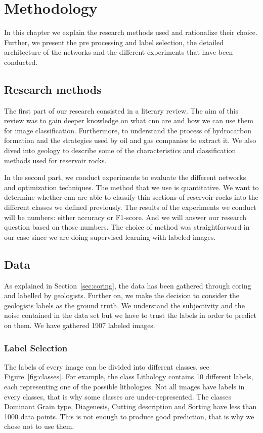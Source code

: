 \chapter{Methodology}\label{chp:methodology}
In this chapter we explain the research methods used and rationalize their choice. Further, we present the pre processing and label selection, the detailed architecture of the networks and the different experiments that have been conducted. 

\section{Research methods}
The first part of our research consisted in a literary review. The aim of this review was to gain deeper knowledge on what \gls{cnn} are and how we can use them for image classification. Furthermore, to understand the process of hydrocarbon formation and the strategies used by oil and gas companies to extract it. We also dived into geology to describe some of the characteristics and classification methods used for reservoir rocks.

In the second part, we conduct experiments to evaluate the different networks and optimization techniques. The method that we use is quantitative. We want to determine whether \gls{cnn} are able to classify thin sections of reservoir rocks into the different classes we defined previously. The results of the experiments we conduct will be numbers: either accuracy or F1-score. And we will answer our research question based on those numbers. The choice of method was straightforward in our case since we are doing supervised learning with labeled images. 

\section{Data}

As explained in Section~\ref{sec:coring}, the data has been gathered through coring and labelled by geologists. Further on, we make the decision to consider the geologists labels as the ground truth. We understand the subjectivity and the noise contained in the data set but we have to trust the labels in order to predict on them. We have gathered 1907 labeled images. 

\subsection{Label Selection}
 The labels of every image can be divided into different classes, see Figure~\ref{fig:classes}. For example, the class Lithology contains 10 different labels, each representing one of the possible lithologies. Not all images have labels in every classes, that is why some classes are under-represented. The classes Dominant Grain type, Diagenesis, Cutting description and Sorting have less than 1000 data points. This is not enough to produce good prediction, that is why we chose not to use them.
 
